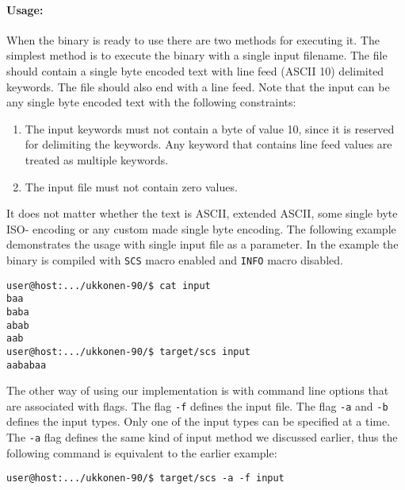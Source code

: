 \documentclass[english,twoside,censored,csm,algorithms-track-2020]{HYthesisML}
\theoremstyle{plain}
\theoremstyle{definition}
\numberwithin{testexample}{chapter}
\begin{document}
\paragraph{Usage:}
When the binary is ready to use there are two methods for executing it. The simplest method is to
execute the binary with a single input filename. The file should contain a single byte encoded text with
line feed (ASCII 10) delimited keywords. The file should also end with a line feed. Note that the input
can be any single byte encoded text with the following constraints:

\begin{enumerate}
\item The input keywords must not contain a byte of value 10, since it is reserved for delimiting the
  keywords. Any keyword that contains line feed values are treated as multiple
  keywords.
\item The input file must not contain zero values.
\end{enumerate}

It does not matter whether the text is ASCII, extended ASCII, some single byte ISO- encoding or any
custom made single byte encoding. The following example demonstrates the usage with single input
file as a parameter. In the example the binary is compiled with \texttt{SCS} macro enabled and
\texttt{INFO} macro disabled.

\begin{verbatim}
user@host:.../ukkonen-90/$ cat input
baa
baba
abab
aab
user@host:.../ukkonen-90/$ target/scs input
aababaa
\end{verbatim}

The other way of using our implementation is with command line options that are associated with
flags. The flag \texttt{-f} defines the input file. The flag \texttt{-a} and \texttt{-b} defines
the input types. Only one of the
input types can be specified at a time. The \texttt{-a} flag defines the same kind of input method
we discussed earlier, thus the following command is equivalent to the earlier example:

\begin{verbatim}
user@host:.../ukkonen-90/$ target/scs -a -f input
\end{verbatim}
\end{document}
